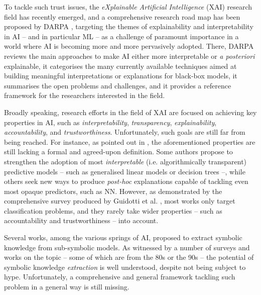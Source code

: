 \documentclass[12pt,a4paper,openright,twoside]{book}
\begin{document}
To tackle such trust issues, the \emph{eXplainable Artificial Intelligence} (XAI) research field has recently emerged, and a comprehensive research road map has been proposed by DARPA \cite{darpa2016-xai}, targeting the themes of explainability and interpretability in AI -- and in particular ML -- as a challenge of paramount importance in a world where AI is becoming more and more pervasively adopted.
%
There, DARPA reviews the main approaches to make AI either more interpretable or \emph{a posteriori} explainable, it categorises the many currently available techniques aimed at building meaningful interpretations or explanations for black-box models, it summarises the open problems and challenges, and it provides a reference framework for the researchers interested in the field.

Broadly speaking, research efforts in the field of XAI are focused on achieving key properties in AI, such as \emph{interpretability}, \emph{transparency}, \emph{explainability}, \emph{accountability}, and \emph{trustworthiness}.
%
Unfortunately, such goals are still far from being reached.
%
For instance, as pointed out in \cite{Lipton18}, the aforementioned properties are still lacking a formal and agreed-upon definition.
%
Some authors \cite{Rudin2019} propose to strengthen the adoption of most \emph{interpretable} (i.e. algorithmically transparent) predictive models -- such as generalised linear models or decision trees --, while others seek new ways to produce \emph{post-hoc} explanations capable of tackling even most opaque predictors, such as NN.
%
However, as demonstrated by the comprehensive survey produced by Guidotti et al. \cite{GuidottiMRTGP19}, most works only target classification problems, and they rarely take wider properties -- such as accountability and trustworthiness -- into account.

Several works, among the various springs of AI, proposed to extract symbolic knowledge from sub-symbolic models.
%
As witnessed by a number of surveys \cite{GuidottiMRTGP19, GarcezBRFHIKLMS15, AndrewsDT95, GarcezBG01} and works on the topic \cite{BolognaH18, BolognaH16, FrosstH17, JohanssonN09, KrishnanSB1999, HruschkaE2006, ZhouZYS1983, CravenS95, AugastaK12, SatoT2002, KahramanliA09a} -- some of which are from the 80s or the 90s -- the potential of symbolic knowledge \emph{extraction} is well understood, despite not being subject to hype.
%
Unfortunately, a comprehensive and general framework tackling such problem in a general way is still missing.
\end{document}
